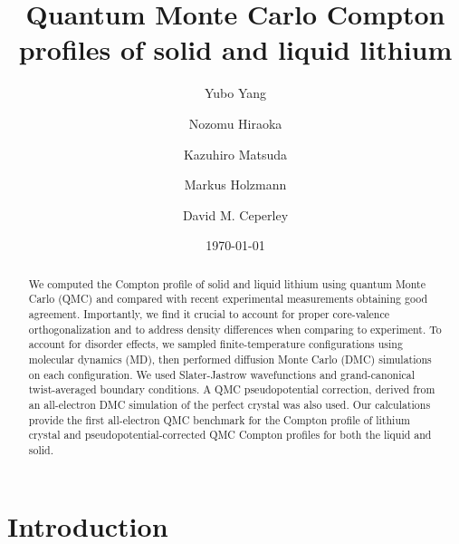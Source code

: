 \documentclass[aps,prb,showpacs,preprintnumbers,amsmath,amssymb,superscriptaddress,twocolumn]{revtex4-1}
\begin{document}
\title{Quantum Monte Carlo Compton profiles of solid and liquid lithium}
\author{Yubo Yang}
\author{Nozomu Hiraoka}
\author{Kazuhiro Matsuda}
\author{Markus Holzmann}
\author{David M. Ceperley}
\date{\today}
\begin{abstract}
We computed the Compton profile of solid and liquid lithium using quantum Monte Carlo (QMC) and compared with recent experimental measurements obtaining good agreement. Importantly, we find it crucial to account for proper core-valence orthogonalization and to address density differences when comparing to experiment. To account for disorder effects, we sampled finite-temperature configurations using molecular dynamics (MD), then performed diffusion Monte Carlo (DMC) simulations on each configuration. We used Slater-Jastrow wavefunctions and grand-canonical twist-averaged boundary conditions. A QMC pseudopotential correction, derived from an all-electron DMC simulation of the perfect crystal was also used. Our calculations provide the first all-electron QMC benchmark for the Compton profile of lithium crystal and pseudopotential-corrected QMC Compton profiles for both the liquid and solid.
\end{abstract}
\pacs{}
\maketitle

\section{Introduction} \label{sec:intro}
\end{document}
